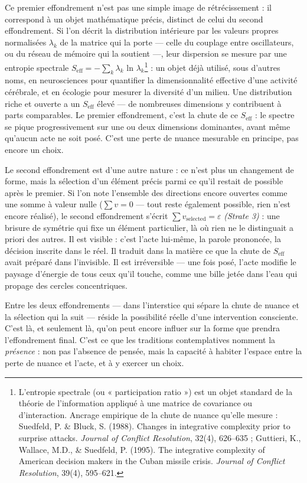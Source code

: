 \documentclass[french, 11pt, twoside, openright, a5paper]{book}
\begin{document}
Ce premier effondrement n'est pas une simple image de rétrécissement :
il correspond à un objet mathématique précis, distinct de celui du
second effondrement. Si l'on décrit la distribution intérieure par les
valeurs propres normalisées $\lambda_k$ de la matrice qui la porte --- celle du
couplage entre oscillateurs, ou du réseau de mémoire qui la soutient
---, leur dispersion se mesure par une entropie spectrale $S_{\text{eff}} = -\sum_k \lambda_k$
ln $\lambda_k$\footnote{L'entropie spectrale (ou « participation ratio ») est un objet standard de la théorie de l'information appliqué à une matrice de covariance ou d'interaction. Ancrage empirique de la chute de nuance qu'elle mesure : Suedfeld, P. \& Bluck, S. (1988). Changes in integrative complexity prior to surprise attacks. \emph{Journal of Conflict Resolution}, 32(4), 626--635 ; Guttieri, K., Wallace, M.D., \& Suedfeld, P. (1995). The integrative complexity of American decision makers in the Cuban missile crisis. \emph{Journal of Conflict Resolution}, 39(4), 595--621.} : un objet déjà utilisé, sous d'autres noms, en neurosciences
pour quantifier la dimensionnalité effective d'une activité cérébrale,
et en écologie pour mesurer la diversité d'un milieu. Une distribution
riche et ouverte a un $S_{\text{eff}}$ élevé --- de nombreuses dimensions y
contribuent à parts comparables. Le premier effondrement, c'est la chute
de ce $S_{\text{eff}}$ : le spectre se pique progressivement sur une ou deux
dimensions dominantes, avant même qu'aucun acte ne soit posé. C'est une
perte de nuance mesurable en principe, pas encore un choix.

Le second effondrement est d'une autre nature : ce n'est plus un
changement de forme, mais la sélection d'un élément précis parmi ce
qu'il restait de possible après le premier. Si l'on note l'ensemble des
directions encore ouvertes comme une somme à valeur nulle ($\sum v = 0$ ---
tout reste également possible, rien n'est encore réalisé), le second
effondrement s'écrit $\sum v_{\text{selected}} = \varepsilon$ \emph{(Strate 3)} : une brisure de
symétrie qui fixe un élément particulier, là où rien ne le distinguait a
priori des autres. Il est visible : c'est l'acte lui-même, la parole
prononcée, la décision inscrite dans le réel. Il traduit dans la matière
ce que la chute de $S_{\text{eff}}$ avait préparé dans l'invisible. Il est
irréversible --- une fois posé, l'acte modifie le paysage d'énergie de
tous ceux qu'il touche, comme une bille jetée dans l'eau qui propage des
cercles concentriques.

Entre les deux effondrements --- dans l'interstice qui sépare la chute
de nuance et la sélection qui la suit --- réside la possibilité réelle
d'une intervention consciente. C'est là, et seulement là, qu'on peut
encore influer sur la forme que prendra l'effondrement final. C'est ce
que les traditions contemplatives nomment la \emph{présence} : non pas
l'absence de pensée, mais la capacité à habiter l'espace entre la perte
de nuance et l'acte, et à y exercer un choix.
\end{document}
